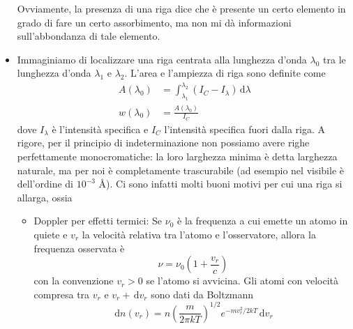 \documentclass[a4paper,11pt]{article}
\renewcommand{\d}{\mathrm{d}} %
\renewcommand{\d}{\,\mathrm{d}}
\theoremstyle{theorem}
\theoremstyle{definition}
\begin{document}
\begin{itemize}
\begin{figure}[h]
	\end{figure}
	\begin{figure}[h]
		\centering
	\end{figure}
	Ovviamente, la presenza di una riga dice che è presente un certo elemento in grado di fare un certo assorbimento, ma non mi dà informazioni sull'abbondanza di tale elemento.
	\item Immaginiamo di localizzare una riga centrata alla lunghezza d'onda $\lambda_0$ tra le lunghezza d'onda $\lambda_1$ e $\lambda_2$. L'area e l'ampiezza di riga sono definite come
	\begin{align*}
		A(\lambda_0)&=\int_{\lambda_1}^{\lambda_2}(I_C-I_\lambda)\d\lambda\\
		w(\lambda_0)&=\frac{A(\lambda_0)}{I_C}
	\end{align*}
	dove $I_\lambda$ è l'intensità specifica e $I_C$ l'intensità specifica fuori dalla riga. A rigore, per il principio di indeterminazione non possiamo avere righe perfettamente monocromatiche: la loro larghezza minima è detta larghezza naturale, ma per noi è completamente trascurabile (ad esempio nel visibile è dell'ordine di $10^{-3}$ \AA). Ci sono infatti molti buoni motivi per cui una riga si allarga, ossia
	\begin{itemize}
		\item Doppler per effetti termici: Se $\nu_0$ è la frequenza a cui emette un atomo in quiete e $v_r$ la velocità relativa tra l'atomo e l'osservatore, allora la frequenza osservata è 
		\[\nu=\nu_0\left(1+\frac{v_r}{c}\right)\]
		con la convenzione $v_r>0$ se l'atomo si avvicina. Gli atomi con velocità compresa tra $v_r$ e $v_r+\d v_r$ sono dati da Boltzmann
		\[\d n(v_r)=n\left(\frac{m}{2\pi kT}\right)^{1/2}e^{-mv_r^2/2kT}\d v_r\]

\end{itemize}
\end{itemize}
\end{document}
